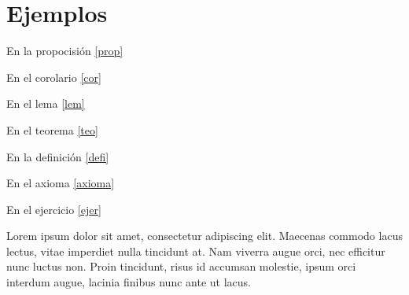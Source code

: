 \chapter{Ejemplos}

\begin{prop}[Nombre]\label{prop}
    \lipsum[2]
\end{prop}

\begin{prop}\label{prop}
    \lipsum[2]
\end{prop}

En la propocisión \ref{prop}

\begin{cor}\label{cor}
    \lipsum[2-3]
\end{cor}

En el corolario \ref{cor}

\begin{lem}\label{lem}
    \lipsum[2]
\end{lem}

En el lema \ref{lem}

\begin{teo}\label{teo}
    \lipsum[2-3]
\end{teo}

En el teorema \ref{teo}

\begin{defi}[Hola]\label{defi}
    \lipsum[2]
\end{defi}


En la definición \ref{defi}

\begin{axioma}\label{axioma}
    \lipsum[2]
\end{axioma}

En el axioma \ref{axioma}

\begin{ejer}\label{ejer}
    \lipsum[2]
\end{ejer}

En el ejercicio \ref{ejer}

\newpage

\begin{pcuno}
    Lorem ipsum dolor sit amet, consectetur adipiscing elit. Maecenas commodo lacus lectus, vitae imperdiet nulla tincidunt at. Nam viverra augue orci, nec efficitur nunc luctus non. Proin tincidunt, risus id accumsan molestie, ipsum orci interdum augue, lacinia finibus nunc ante ut lacus.
\end{pcuno}

